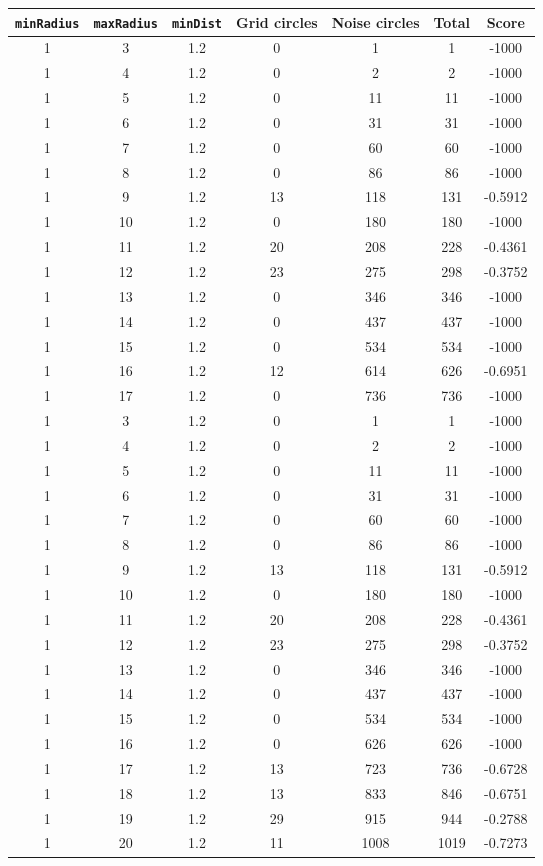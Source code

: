 \documentclass[letterpaper, 12pt]{article}
\begin{document}
\begin{longtable}{|c|c|c|c|c|c|c|}
\hline
\textbf{\texttt{minRadius}} & \textbf{\texttt{maxRadius}} & \textbf{\texttt{minDist}} & \textbf{Grid circles} & \textbf{Noise circles} & \textbf{Total} & \textbf{Score} \\
\hline
1 & 3 & 1.2 & 0 & 1 & 1 & -1000 \\
\hline
1 & 4 & 1.2 & 0 & 2 & 2 & -1000 \\
\hline
1 & 5 & 1.2 & 0 & 11 & 11 & -1000 \\
\hline
1 & 6 & 1.2 & 0 & 31 & 31 & -1000 \\
\hline
1 & 7 & 1.2 & 0 & 60 & 60 & -1000 \\
\hline
1 & 8 & 1.2 & 0 & 86 & 86 & -1000 \\
\hline
1 & 9 & 1.2 & 13 & 118 & 131 & -0.5912 \\
\hline
1 & 10 & 1.2 & 0 & 180 & 180 & -1000 \\
\hline
1 & 11 & 1.2 & 20 & 208 & 228 & -0.4361 \\
\hline
1 & 12 & 1.2 & 23 & 275 & 298 & -0.3752 \\
\hline
1 & 13 & 1.2 & 0 & 346 & 346 & -1000 \\
\hline
1 & 14 & 1.2 & 0 & 437 & 437 & -1000 \\
\hline
1 & 15 & 1.2 & 0 & 534 & 534 & -1000 \\
\hline
1 & 16 & 1.2 & 12 & 614 & 626 & -0.6951 \\
\hline
1 & 17 & 1.2 & 0 & 736 & 736 & -1000 \\
\hline
1 & 3 & 1.2 & 0 & 1 & 1 & -1000 \\
\hline
1 & 4 & 1.2 & 0 & 2 & 2 & -1000 \\
\hline
1 & 5 & 1.2 & 0 & 11 & 11 & -1000 \\
\hline
1 & 6 & 1.2 & 0 & 31 & 31 & -1000 \\
\hline
1 & 7 & 1.2 & 0 & 60 & 60 & -1000 \\
\hline
1 & 8 & 1.2 & 0 & 86 & 86 & -1000 \\
\hline
1 & 9 & 1.2 & 13 & 118 & 131 & -0.5912 \\
\hline
1 & 10 & 1.2 & 0 & 180 & 180 & -1000 \\
\hline
1 & 11 & 1.2 & 20 & 208 & 228 & -0.4361 \\
\hline
1 & 12 & 1.2 & 23 & 275 & 298 & -0.3752 \\
\hline
1 & 13 & 1.2 & 0 & 346 & 346 & -1000 \\
\hline
1 & 14 & 1.2 & 0 & 437 & 437 & -1000 \\
\hline
1 & 15 & 1.2 & 0 & 534 & 534 & -1000 \\
\hline
1 & 16 & 1.2 & 0 & 626 & 626 & -1000 \\
\hline
1 & 17 & 1.2 & 13 & 723 & 736 & -0.6728 \\
\hline
1 & 18 & 1.2 & 13 & 833 & 846 & -0.6751 \\
\hline
1 & 19 & 1.2 & 29 & 915 & 944 & -0.2788 \\
\hline
1 & 20 & 1.2 & 11 & 1008 & 1019 & -0.7273 \\
\hline
\end{longtable}
\end{document}
